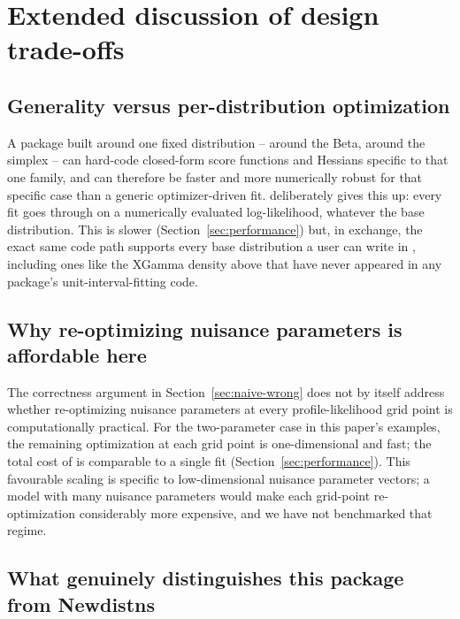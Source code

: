 \documentclass[article]{jss}
\begin{document}
\section{Extended discussion of design trade-offs}
\label{sec:tradeoffs}

\subsection{Generality versus per-distribution optimization}

A package built around one fixed distribution --  around the Beta,  around the simplex -- can hard-code closed-form score functions and Hessians specific to that one family, and can therefore be faster and more numerically robust for that specific case than a generic optimizer-driven fit.  deliberately gives this up: every fit goes through  on a numerically evaluated log-likelihood, whatever the base distribution. This is slower (Section~\ref{sec:performance}) but, in exchange, the exact same code path supports every base distribution a user can write in , including ones like the XGamma density above that have never appeared in any  package's unit-interval-fitting code.

\subsection{Why re-optimizing nuisance parameters is affordable here}

The correctness argument in Section~\ref{sec:naive-wrong} does not by itself address whether re-optimizing nuisance parameters at every profile-likelihood grid point is computationally practical. For the two-parameter case in this paper's examples, the remaining optimization at each grid point is one-dimensional and fast; the total cost of  is comparable to a single fit (Section~\ref{sec:performance}). This favourable scaling is specific to low-dimensional nuisance parameter vectors; a model with many nuisance parameters would make each grid-point re-optimization considerably more expensive, and we have not benchmarked that regime.

\subsection{What genuinely distinguishes this package from Newdistns}
\end{document}
